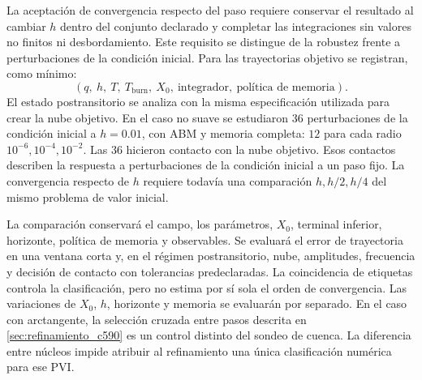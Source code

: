 La aceptación de convergencia respecto del paso requiere conservar el resultado
al cambiar \(h\) dentro del conjunto declarado y completar las integraciones
sin valores no finitos ni desbordamiento. Este requisito se distingue de la
robustez frente a perturbaciones de la condición inicial. Para las trayectorias
objetivo se registran, como mínimo:
\begin{equation}
\left(
q,\ h,\ T,\ T_{\mathrm{burn}},\ X_0,\
\text{integrador},\ \text{política de memoria}
\right).
\label{eq:contrato_numerico_minimo}
\end{equation}
El estado postransitorio se analiza con la misma especificación utilizada para crear
la nube objetivo. En el caso no suave se estudiaron \(36\) perturbaciones de
la condición inicial a \(h=0.01\), con ABM y memoria completa: \(12\) para
cada radio \(10^{-6},10^{-4},10^{-2}\). Las \(36\) hicieron contacto con la
nube objetivo. Esos contactos describen la respuesta a perturbaciones de la condición inicial
a un paso fijo. La convergencia respecto de \(h\)
requiere todavía una comparación
\(h,h/2,h/4\) del mismo problema de valor inicial.

La comparación conservará el campo, los
parámetros, \(X_0\), terminal inferior, horizonte, política de memoria y
observables. Se evaluará el error de trayectoria en una ventana corta y, en el
régimen postransitorio, nube, amplitudes, frecuencia y decisión de contacto con
tolerancias predeclaradas. La coincidencia de etiquetas controla la
clasificación, pero no estima por sí sola el orden de convergencia. Las variaciones de \(X_0\), \(h\), horizonte y memoria se evaluarán por separado.
En el caso con arctangente, la selección cruzada entre pasos descrita en
\cref{sec:refinamiento_c590} es un control distinto del sondeo de cuenca.
La diferencia entre núcleos impide atribuir al refinamiento una única
clasificación numérica para ese PVI.
